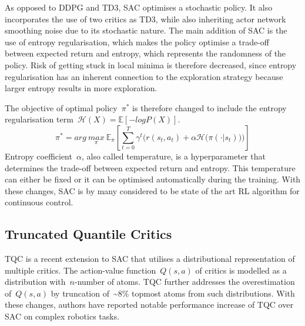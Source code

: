 As opposed to DDPG and TD3, SAC \cite{haarnoja_soft_2018} optimises a stochastic policy. It also incorporates the use of two critics as TD3, while also inheriting actor network smoothing noise due to its stochastic nature. The main addition of SAC is the use of entropy regularisation, which makes the policy optimise a trade-off between expected return and entropy, which represents the randomness of the policy. Risk of getting stuck in local minima is therefore decreased, since entropy regularisation has an inherent connection to the exploration strategy because larger entropy results in more exploration.

The objective of optimal policy~\(\pi^{*}\) is therefore changed to include the entropy regularisation term~\(\mathcal{H}(X) = \mathbb{E} [-log P(X)]\).
\begin{equation}
    \pi^{*} = arg\ \underset{\pi}{max}\ \mathbb{E}_{\pi} \left[ \sum\limits_{t=0}^T \gamma^{t} \bigg( r(s_{t}, a_{t})  + \alpha \mathcal{H}\big(\pi(\cdot \vert s_{t})\big) \bigg) \right]
\end{equation}
Entropy coefficient~\(\alpha\), also called temperature, is a hyperparameter that determines the trade-off between expected return and entropy. This temperature can either be fixed or it can be optimised automatically during the training. With these changes, SAC is by many considered to be state of the art RL algorithm for continuous control.


\subsection{Truncated Quantile Critics}

TQC \cite{kuznetsov_controlling_2020} is a recent extension to SAC that utilises a distributional representation of multiple critics. The action-value function~\(Q(s, a)\) of critics is modelled as a distribution with~\(n\)-number of atoms. TQC further addresses the overestimation of~\(Q(s, a)\) by truncation of~\textasciitilde\(8\)\% topmost atoms from such distributions. With these changes, authors have reported notable performance increase of TQC over SAC on complex robotics tasks.
